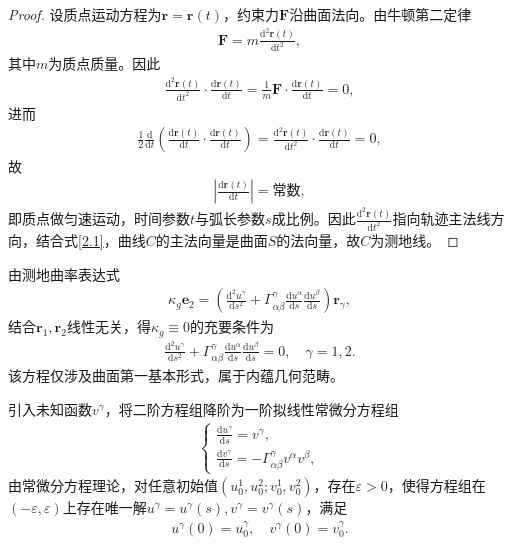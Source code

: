 \documentclass[../../main.tex]{subfiles}%
\begin{document}
\begin{proof}

设质点运动方程为$\boldsymbol{r}=\boldsymbol{r}(t)$，约束力$\boldsymbol{F}$沿曲面法向。由牛顿第二定律
\begin{align}
\boldsymbol{F}=m\frac{\mathrm{d}^2\boldsymbol{r}(t)}{\mathrm{d}t^2},
\end{align}
其中$m$为质点质量。因此
\begin{align*}
\frac{\mathrm{d}^2\boldsymbol{r}(t)}{\mathrm{d}t^2}\cdot\frac{\mathrm{d}\boldsymbol{r}(t)}{\mathrm{d}t}=\frac{1}{m}\boldsymbol{F}\cdot\frac{\mathrm{d}\boldsymbol{r}(t)}{\mathrm{d}t}=0,
\end{align*}
进而
\begin{align*}
\frac{1}{2}\frac{\mathrm{d}}{\mathrm{d}t}\left(\frac{\mathrm{d}\boldsymbol{r}(t)}{\mathrm{d}t}\cdot\frac{\mathrm{d}\boldsymbol{r}(t)}{\mathrm{d}t}\right)=\frac{\mathrm{d}^2\boldsymbol{r}(t)}{\mathrm{d}t^2}\cdot\frac{\mathrm{d}\boldsymbol{r}(t)}{\mathrm{d}t}=0,
\end{align*}
故
\begin{align}
\left|\frac{\mathrm{d}\boldsymbol{r}(t)}{\mathrm{d}t}\right|=\text{常数},
\end{align}
即质点做匀速运动，时间参数$t$与弧长参数$s$成比例。因此$\frac{\mathrm{d}^2\boldsymbol{r}(t)}{\mathrm{d}t^2}$指向轨迹主法线方向，结合式\eqref{2.1}，曲线$C$的主法向量是曲面$S$的法向量，故$C$为测地线。

\end{proof}

由测地曲率表达式
\begin{align}
\kappa_g \boldsymbol{e}_2=\left(\frac{\mathrm{d}^2u^\gamma}{\mathrm{d}s^2}+\Gamma^\gamma_{\alpha\beta}\frac{\mathrm{d}u^\alpha}{\mathrm{d}s}\frac{\mathrm{d}u^\beta}{\mathrm{d}s}\right)\boldsymbol{r}_\gamma,
\end{align}
结合$\boldsymbol{r}_1,\boldsymbol{r}_2$线性无关，得$\kappa_g\equiv0$的充要条件为
\begin{align}
\frac{\mathrm{d}^2u^\gamma}{\mathrm{d}s^2}+\Gamma^\gamma_{\alpha\beta}\frac{\mathrm{d}u^\alpha}{\mathrm{d}s}\frac{\mathrm{d}u^\beta}{\mathrm{d}s}=0,\quad \gamma=1,2.
\end{align}
该方程仅涉及曲面第一基本形式，属于内蕴几何范畴。

引入未知函数$v^\gamma$，将二阶方程组降阶为一阶拟线性常微分方程组
\begin{align}
\begin{cases}
\frac{\mathrm{d}u^\gamma}{\mathrm{d}s}=v^\gamma,\\
\frac{\mathrm{d}v^\gamma}{\mathrm{d}s}=-\Gamma^\gamma_{\alpha\beta}v^\alpha v^\beta,
\end{cases}
\end{align}
由常微分方程理论，对任意初始值$(u_0^1,u_0^2;v_0^1,v_0^2)$，存在$\varepsilon>0$，使得方程组在$(-\varepsilon,\varepsilon)$上存在唯一解$u^\gamma=u^\gamma(s),v^\gamma=v^\gamma(s)$，满足
\begin{align}
u^\gamma(0)=u_0^\gamma,\quad v^\gamma(0)=v_0^\gamma.
\end{align}
\end{document}
